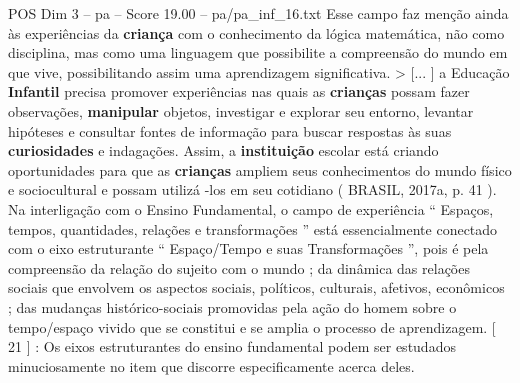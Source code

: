\begin{textsample}{POS Dim 3 – pa – Score 19.00 – pa/pa\_inf\_16.txt}
Esse campo faz menção ainda às experiências da \textbf{criança} com o conhecimento da lógica matemática, não como disciplina, mas como uma linguagem que possibilite a compreensão do mundo em que vive, possibilitando assim uma aprendizagem significativa. > [... ] a Educação \textbf{Infantil} precisa promover experiências nas quais as \textbf{crianças} possam fazer observações, \textbf{manipular} objetos, investigar e explorar seu entorno, levantar hipóteses e consultar fontes de informação para buscar respostas às suas \textbf{curiosidades} e indagações.
Assim, a \textbf{instituição} escolar está criando oportunidades para que as \textbf{crianças} ampliem seus conhecimentos do mundo físico e sociocultural e possam utilizá -los em seu cotidiano ( BRASIL, 2017a, p. 41 ).
Na interligação com o Ensino Fundamental, o campo de experiência “ Espaços, tempos, quantidades, relações e transformações ” está essencialmente conectado com o eixo estruturante “ Espaço/Tempo e suas Transformações ”, pois é pela compreensão da relação do sujeito com o mundo ; da dinâmica das relações sociais que envolvem os aspectos sociais, políticos, culturais, afetivos, econômicos ; das mudanças histórico-sociais promovidas pela ação do homem sobre o tempo/espaço vivido que se constitui e se amplia o processo de aprendizagem. [ 21 ] : Os eixos estruturantes do ensino fundamental podem ser estudados minuciosamente no item que discorre especificamente acerca deles.

\end{textsample}
